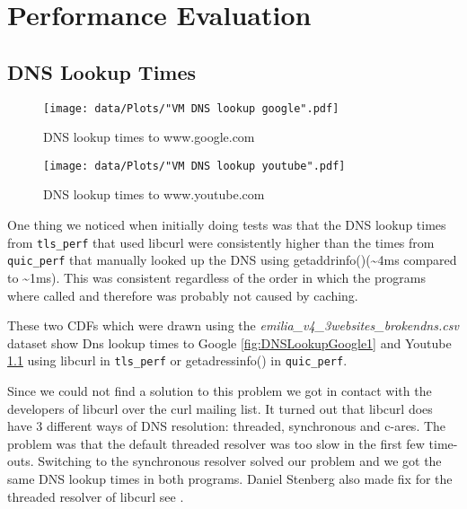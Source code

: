 \chapter{Performance Evaluation}\label{chapter_performance_evaluation}

\section{DNS Lookup Times}
\label{section:dns_lookup_times}

\begin{figure}[!thb]
	\centering
	\begin{minipage}{.45\textwidth}
		\centering
		\texttt{[image: data/Plots/"VM DNS lookup google".pdf]}
		\caption{DNS lookup times to www.google.com}
  		\label{fig:DNSLookupGoogle1}
  	\end{minipage}%
  	\hspace{0.5cm}
  	\begin{minipage}{.45\textwidth}
		\centering
		\texttt{[image: data/Plots/"VM DNS lookup youtube".pdf]}
		\caption{DNS lookup times to www.youtube.com}
  		\label{fig:DNSLookupYoutube1}
  	\end{minipage}
\end{figure}

One thing we noticed when initially doing tests was that the DNS lookup times from \texttt{tls\_perf} that used libcurl were consistently higher than the times from \texttt{quic\_perf} that manually looked up the DNS using getaddrinfo()(\textasciitilde 4ms compared to \textasciitilde 1ms).
This was consistent regardless of the order in which the programs where called and therefore was probably not caused by caching.

These two CDFs which were drawn using the \textit{emilia\_v4\_3websites\_brokendns.csv} dataset show Dns lookup times to Google \ref{fig:DNSLookupGoogle1} and Youtube \ref{fig:DNSLookupYoutube1} using libcurl in \texttt{tls\_perf} or getadressinfo() in \texttt{quic\_perf}.

Since we could not find a solution to this problem we got in contact with the developers of libcurl over the curl mailing list.
It turned out that libcurl does have 3 different ways of DNS resolution: threaded, synchronous and c-ares.
The problem was that the default threaded resolver was too slow in the first few time-outs.
Switching to the synchronous resolver solved our problem and we got the same DNS lookup times in both programs.
Daniel Stenberg also made fix for the threaded resolver of libcurl see  \cite{Link:curlFix}.

